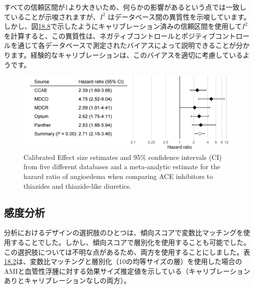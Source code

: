\documentclass[
  11pt]{book}
\theoremstyle{definition}
\theoremstyle{definition}
\theoremstyle{definition}
\theoremstyle{definition}
\theoremstyle{remark}
\begin{document}
すべての信頼区間が1より大きいため、何らかの影響があるという点では一致していることが示唆されますが、\(I^2\) はデータベース間の異質性を示唆しています。しかし、図\href{https://ohdsi.github.io/TheBookOfOhdsi/MethodValidity.html\#fig:forestCal}{18.8}で示したようにキャリブレーション済みの信頼区間を使用して\(I^2\) を計算すると、この異質性は、ネガティブコントロールとポジティブコントロールを通じて各データベースで測定されたバイアスによって説明できることが分かります。経験的なキャリブレーションは、このバイアスを適切に考慮しているようです。

\begin{figure}

{\centering \includegraphics[width=0.9\linewidth]{images/MethodValidity/forestCal} 

}

\caption{Calibrated Effect size estimates and 95\% confidence intervals (CI) from five different databases and a meta-analytic estimate for the hazard ratio of angioedema when comparing ACE inhibitors to thiazides and thiazide-like diuretics.}\label{fig:forestCal}
\end{figure}

\subsection{感度分析}\label{ux611fux5ea6ux5206ux6790-1}

分析におけるデザインの選択肢のひとつは、傾向スコアで変数比マッチングを使用することでした。しかし、傾向スコアで層別化を使用することも可能でした。この選択肢については不明な点があるため、両方を使用することにしました。表\href{https://ohdsi.github.io/TheBookOfOhdsi/MethodValidity.html\#tab:sensAnalysis}{18.2}は、変数比マッチングと層別化（10の均等サイズの層）を使用した場合のAMIと血管性浮腫に対する効果サイズ推定値を示している（キャリブレーションありとキャリブレーションなしの両方）。
\end{document}
